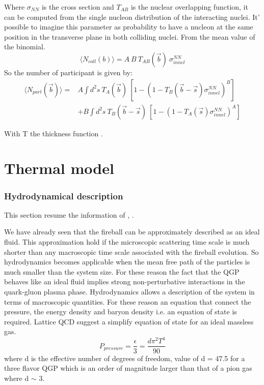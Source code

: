 \documentclass[12pt,a4paper]{book}
\begin{document}
	Where $\sigma_{NN}$ is the cross section and $T_{AB}$ is the nuclear overlapping function, it can be computed from the single nucleon distribution of the interacting nuclei. It' possible to imagine this parameter as probability to have a nucleon at the same position in the transverse plane in both colliding nuclei. From the mean value of the binomial.
	\begin{equation}
		\langle N_{coll}(b) \rangle = A\ B \ T_{AB}(\vec{b}) \ \sigma_{innel}^{NN}
		\label{eq:num_collisione}
	\end{equation}
	So the number of participant is given by:
	\begin{equation}
		\begin{aligned}
			\langle N_{part}(\vec{b}) \rangle = & A \int d^2 s \ T_{A}(\vec{b}) \ \left[1-\left( 1 - T_{B}(\vec{b}-\vec{s}) \sigma_{innel}^{NN} \right)^B \right] \\
			& + B \int d^2 s \ T_{B}(\vec{b}-\vec{s}) \ \left[1-\left( 1 - T_{A}(\vec{s}) \sigma_{innel}^{NN} \right)^A \right]
		\end{aligned}
		\label{eq:num_partecipant}
	\end{equation}
	
	With T the  thickness function \cite{Arata:2922803}.
	
	\chapter{Thermal model}
	\subsection{Hydrodynamical description}
	This section resume the information of \cite{heinz2004conceptsheavyionphysics}, \cite{phdthesis}.
	
	We have already seen that the fireball can be approximately described as an ideal fluid. This approximation hold if the microscopic scattering time scale is much shorter than any macroscopic time scale associated with the fireball evolution. So hydrodynamics becomes applicable when the mean free path of the particles is much smaller than the system size. For these reason the fact that the QGP behaves like an ideal fluid implies strong non-perturbative interactions in the quark-gluon plasma phase. Hydrodynamics allows a description of the system in terms of macroscopic quantities. For these reason an equation that connect the pressure, the energy density and baryon density i.e. an equation of state is required. Lattice QCD suggest a simplify equation of state for an ideal massless gas.
	\begin{equation}
		P_{pressure}=\frac{\epsilon}{3}=\frac{d \pi^2 T^4}{90}
		\label{eq:EoS}
	\end{equation}
	where d is the effective number of degrees of freedom, value of d = 47.5 for a three flavor QGP which is an order of magnitude larger than that of a pion gas where d $\sim$ 3. \cite{Snellings_2011}
	
\end{document}
